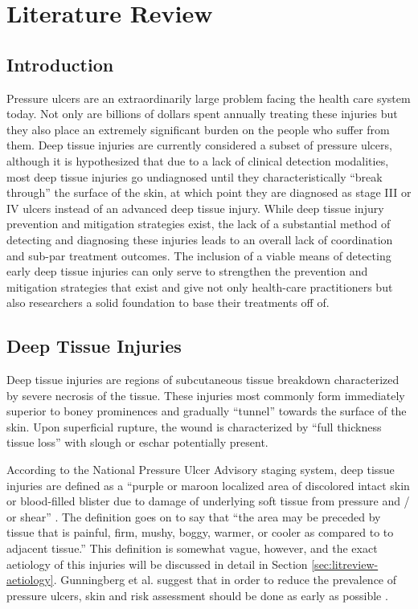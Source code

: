 \chapter{Literature Review}
\label{chap:litreview}
	\section{Introduction}
		Pressure ulcers are an extraordinarily large problem facing the health care system today. Not only are billions of dollars spent annually treating these injuries but they also place an extremely significant burden on the people who suffer from them. Deep tissue injuries are currently considered a subset of pressure ulcers, although it is hypothesized that due to a lack of clinical detection modalities, most deep tissue injuries go undiagnosed until they characteristically ``break through'' the surface of the skin, at which point they are diagnosed as stage III or IV ulcers instead of an advanced deep tissue injury. While deep tissue injury prevention and mitigation strategies exist, the lack of a substantial method of detecting and diagnosing these injuries leads to an overall lack of coordination and sub-par treatment outcomes. The inclusion of a viable means of detecting early deep tissue injuries can only serve to strengthen the prevention and mitigation strategies that exist and give not only health-care practitioners but also researchers a solid foundation to base their treatments off of.

	\section{Deep Tissue Injuries}
		Deep tissue injuries are regions of subcutaneous tissue breakdown characterized by severe necrosis of the tissue. These injuries most commonly form immediately superior to boney prominences and gradually ``tunnel'' towards the surface of the skin. Upon superficial rupture, the wound is characterized by ``full thickness tissue loss'' with slough or eschar potentially present.

		According to the National Pressure Ulcer Advisory staging system, deep tissue injuries are defined as a ``purple or maroon localized area of discolored intact skin or blood-filled blister due to damage of underlying soft tissue from pressure and / or shear'' \cite{npuap07}. The definition goes on to say that ``the area may be preceded by tissue that is painful, firm, mushy, boggy, warmer, or cooler as compared to to adjacent tissue.'' This definition is somewhat vague, however, and the exact aetiology of this injuries will be discussed in detail in Section \ref{sec:litreview-aetiology}. Gunningberg et al. suggest that in order to reduce the prevalence of pressure ulcers, skin and risk assessment should be done as early as possible \cite{gunningberg08}.


